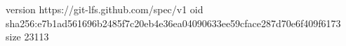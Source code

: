 version https://git-lfs.github.com/spec/v1
oid sha256:e7b1ad561696b2485f7c20eb4e36ea04090633ee59cface287d70e6f409f6173
size 23113

